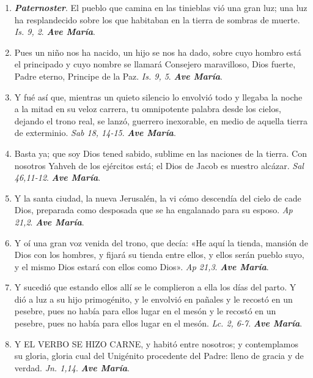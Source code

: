 \documentclass[../../devocionario.tex]{subfiles}
\begin{document}
    \begin{enumerate}
        \item \textbf{\textit{Paternoster}}. El pueblo que camina en las tinieblas vió una gran luz; 
            una luz ha resplandecido sobre los que habitaban en la tierra de sombras de muerte. \textit{Is. 9, 2}. \textbf{\textit{Ave María}}.

        \item Pues un niño nos ha nacido, un hijo se nos ha dado, sobre cuyo hombro está el principado y cuyo nombre 
            se llamará Consejero maravilloso, Dios fuerte, Padre eterno, Principe de la Paz. \textit{Is. 9, 5}. \textbf{\textit{Ave María}}.

        \item Y fué así que, mientras un quieto silencio lo envolvió todo y llegaba la noche a la mitad en su veloz carrera, 
            tu omnipotente palabra desde los cielos, dejando el trono real, se lanzó, guerrero inexorable, 
            en medio de aquella tierra de exterminio. \textit{Sab 18, 14-15}. \textbf{\textit{Ave María}}.

        \item Basta ya; que soy Dios tened sabido, sublime en las naciones de la tierra. Con nosotros Yahveh de los ejércitos está; 
            el Dios de Jacob es nuestro alcázar. \textit{Sal 46,11-12}. \textbf{\textit{Ave María}}.

        \item Y la santa ciudad, la nueva Jerusalén, la vi cómo descendía del cielo de cade Dios, 
            preparada como desposada que se ha engalanado para su esposo. \textit{Ap 21,2}. \textbf{\textit{Ave María}}.

        \item Y oí una gran voz venida del trono, que decía: «He aquí la tienda, mansión de Dios con los hombres, 
            y fijará su tienda entre ellos, y ellos serán pueblo suyo, y el mismo Dios estará con ellos como Dios». \textit{Ap 21,3}. \textbf{\textit{Ave María}}.

        \item Y sucedió que estando ellos allí se le complieron a ella los días del parto. Y dió a luz a su hijo primogénito, 
            y le envolvió en pañales y le recostó en un pesebre, pues no había para ellos lugar en el mesón y le recostó en un pesebre, 
            pues no había para ellos lugar en el mesón. \textit{Lc. 2, 6-7}. \textbf{\textit{Ave María}}.

        \item Y EL VERBO SE HIZO CARNE, y habitó entre nosotros; y contemplamos su gloria, gloria cual del Unigénito procedente del Padre: 
            lleno de gracia y de verdad. \textit{Jn. 1,14}. \textbf{\textit{Ave María}}.


\end{enumerate}
\end{document}
